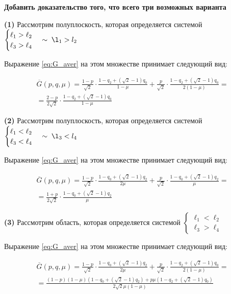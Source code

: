 \begin{flushleft}
	\textbf{Добавить доказательство того, что всего три возможных варианта}

	\textbf{(1)} Рассмотрим полуплоскость, которая определяется системой
	$\begin{cases}
			\ell_1 > \ell_2 \\
			\ell_3 > \ell_4
	\end{cases} \sim \; \l_1 > l_2$
	
	Выражение \eqref{eq:G_aver} на этом множестве принимает следующий вид:
	
	\begin{gather*}
		\overline G(p,q,\mu)=
		\frac{1-p}{\sqrt{2}} \cdot \frac{1-q_2+(\sqrt{2}-1)q_0}{1-\mu} + 
		\frac{p}{\sqrt{2}} \cdot \frac{1-q_2+(\sqrt{2}-1)q_0}{2(1-\mu)} = \\
		=\frac{2-p}{2\sqrt{2}}\cdot\frac{1-q_2+(\sqrt{2}-1)q_0}{1-\mu}		
	\end{gather*}
	
	\textbf{(2)} Рассмотрим полуплоскость, которая определяется системой
	$\begin{cases}
			\ell_1 < \ell_2 \\
			\ell_3 < \ell_4
	\end{cases} \sim \; \l_3 < l_4$
	
	Выражение \eqref{eq:G_aver} на этом множестве принимает следующий вид:
	
	\begin{gather*}
		\overline G(p,q,\mu)=
		\frac{1-p}{\sqrt{2}} \cdot \frac{1-q_0+(\sqrt{2}-1)q_2}{2\mu} + 
		\frac{p}{\sqrt{2}} \cdot \frac{1-q_0+(\sqrt{2}-1)q_2}{\mu} = \\
		=\frac{1+p}{2\sqrt{2}}\cdot\frac{1-q_0+(\sqrt{2}-1)q_2}{\mu}		
	\end{gather*}
	
	\textbf{(3)} Рассмотрим область, которая определяется системой
	$\begin{cases}
			\ell_1 < \ell_2 \\
			\ell_3 > \ell_4
	\end{cases}$

	Выражение \eqref{eq:G_aver} на этом множестве принимает следующий вид:	
	
	\begin{gather*}	
		\overline G(p,q,\mu)=
		\frac{1-p}{\sqrt{2}} \cdot \frac{1-q_0+(\sqrt{2}-1)q_2}{2\mu} +
		\frac{p}{\sqrt{2}} \cdot \frac{1-q_2+(\sqrt{2}-1)q_0}{2(1-\mu)}=\\	
		=\frac{(1-p)(1-\mu)(1-q_0+(\sqrt{2}-1)q_2)+p\mu(1-q_2+(\sqrt{2}-1)q_0)}
		{2\sqrt{2}\mu(1-\mu)}
	\end{gather*}
	

\end{flushleft}
